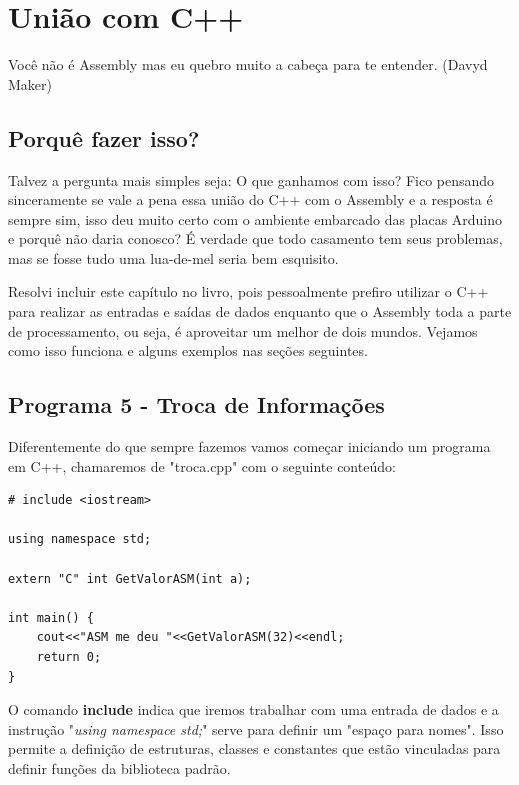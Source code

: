 \chapter{União com C++}

\begin{remark}
	Você não é Assembly mas eu quebro muito a cabeça para te entender. (Davyd Maker) 
\end{remark}

\section{Porquê fazer isso?}
Talvez a pergunta mais simples seja: O que ganhamos com isso? Fico pensando sinceramente se vale a pena essa união do C++ com o Assembly e a resposta é sempre sim, isso deu muito certo com o ambiente embarcado das placas Arduino e porquê não daria conosco? É verdade que todo casamento tem seus problemas, mas se fosse tudo uma lua-de-mel seria bem esquisito.

Resolvi incluir este capítulo no livro, pois pessoalmente prefiro utilizar o C++ para realizar as entradas e saídas de dados enquanto que o Assembly toda a parte de processamento, ou seja, é aproveitar um melhor de dois mundos. Vejamos como isso funciona e alguns exemplos nas seções seguintes.

\section{Programa 5 - Troca de Informações}

Diferentemente do que sempre fazemos vamos começar iniciando um programa em C++, chamaremos de "troca.cpp" com o seguinte conteúdo:
\begin{lstlisting}[]
# include <iostream>

using namespace std;

extern "C" int GetValorASM(int a);

int main() {
	cout<<"ASM me deu "<<GetValorASM(32)<<endl;
	return 0;
}
\end{lstlisting}

O comando \textbf{include} indica que iremos trabalhar com uma entrada de dados e a instrução "\textit{using namespace std;}" serve para definir um "espaço para nomes". Isso permite a definição de estruturas, classes e constantes que estão vinculadas para definir funções da biblioteca padrão. 

